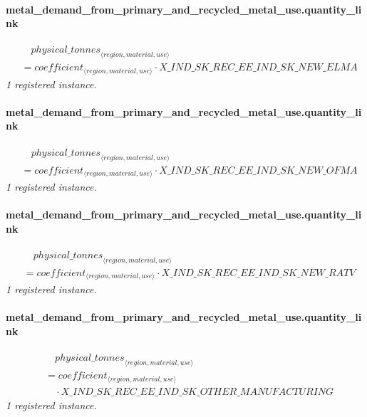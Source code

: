 \documentclass[11pt]{article}
\begin{document}
\paragraph{metal\_demand\_from\_primary\_and\_recycled\_metal\_use.quantity\_link}
\begin{align*}
&\quad {physical\_tonnes}_{\langle region, material, use\rangle}\\
&= coefficient_{\langle region, material, use\rangle} \cdot X\_IND\_SK\_REC\_EE\_IND\_SK\_NEW\_ELMA
\end{align*}
\noindent\emph{1 registered instance.}\par
\paragraph{metal\_demand\_from\_primary\_and\_recycled\_metal\_use.quantity\_link}
\begin{align*}
&\quad {physical\_tonnes}_{\langle region, material, use\rangle}\\
&= coefficient_{\langle region, material, use\rangle} \cdot X\_IND\_SK\_REC\_EE\_IND\_SK\_NEW\_OFMA
\end{align*}
\noindent\emph{1 registered instance.}\par
\paragraph{metal\_demand\_from\_primary\_and\_recycled\_metal\_use.quantity\_link}
\begin{align*}
&\quad {physical\_tonnes}_{\langle region, material, use\rangle}\\
&= coefficient_{\langle region, material, use\rangle} \cdot X\_IND\_SK\_REC\_EE\_IND\_SK\_NEW\_RATV
\end{align*}
\noindent\emph{1 registered instance.}\par
\paragraph{metal\_demand\_from\_primary\_and\_recycled\_metal\_use.quantity\_link}
\begin{align*}
&\quad {physical\_tonnes}_{\langle region, material, use\rangle}\\
&= coefficient_{\langle region, material, use\rangle}\\
&\quad {}\cdot X\_IND\_SK\_REC\_EE\_IND\_SK\_OTHER\_MANUFACTURING
\end{align*}
\noindent\emph{1 registered instance.}\par
\end{document}
